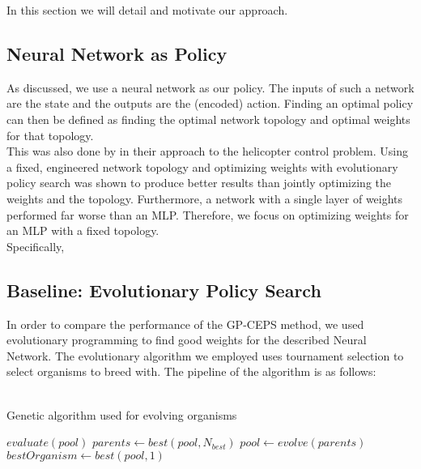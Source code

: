 In this section we will detail and motivate our approach. 

\subsection{Neural Network as Policy}

As discussed, we use a neural network as our policy. The inputs of such a network are the state and the outputs are the (encoded) action. Finding an optimal policy can then be defined as finding the optimal network topology and optimal weights for that topology.\\
This was also done by \cite{koppejan2011neuroevolutionary} in their approach to the helicopter control problem. Using a fixed, engineered network topology and optimizing weights with evolutionary policy search was shown to produce better results than jointly optimizing the weights and the topology. Furthermore, a network with a single layer of weights performed far worse than an MLP. Therefore, we focus on optimizing weights for an MLP with a fixed topology.\\
Specifically, %

\subsection{Baseline: Evolutionary Policy Search}\label{evo_pol_search}

In order to compare the performance of the GP-CEPS method, we used evolutionary programming to find good weights for the described Neural Network. 
The evolutionary algorithm we employed uses tournament selection to select organisms to breed with. The pipeline of the algorithm is as follows:\\ \\

\begin{algorithm}[ht]
  \caption{Genetic algorithm used for evolving organisms}
  \begin{algorithmic}
      \State $evaluate(pool)$
      \State $parents \leftarrow best(pool, N_{best})$
      \State $pool \leftarrow evolve(parents)$
    \EndFor
    \State $bestOrganism \leftarrow best(pool,1)$
  \end{algorithmic}
\end{algorithm}

